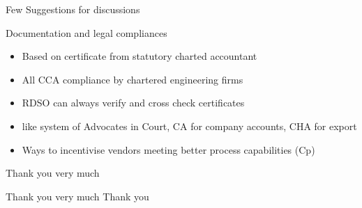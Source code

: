 \documentclass[
  10pt,
  ignorenonframetext,
  aspectratio=43,
]{beamer}
\begin{document}
\begin{frame}{Few Suggestions for discussions}
\protect\hypertarget{few-suggestions-for-discussions}{}
\begin{block}{Documentation and legal compliances}
\protect\hypertarget{documentation-and-legal-compliances}{}
\begin{itemize}
\item
  Based on certificate from statutory charted accountant
\item
  All CCA compliance by chartered engineering firms
\item
  RDSO can always verify and cross check certificates
\item
  like system of Advocates in Court, CA for company accounts, CHA for
  export
\item
  Ways to incentivise vendors meeting better process capabilities (Cp)
\end{itemize}
\end{block}
\end{frame}

\begin{frame}{Thank you very much}
\protect\hypertarget{thank-you-very-much}{}
\begin{block}{Thank you very much}
\protect\hypertarget{thank-you-very-much-1}{}
Thank you
\end{block}
\end{frame}
\end{document}
